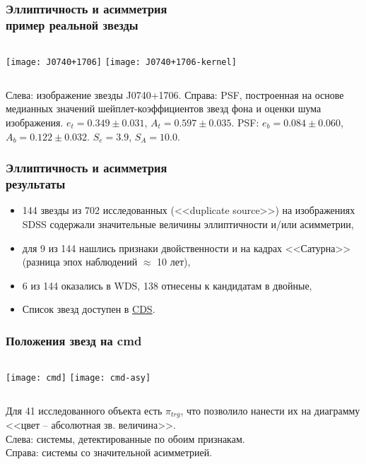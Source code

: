 \begin{frame}
\frametitle{Эллиптичность и асимметрия\\{\small пример реальной звезды}}
\begin{center}
\begin{columns}
	\texttt{[image: J0740+1706]}
	\texttt{[image: J0740+1706-kernel]}
\end{columns}
\end{center}
{\scriptsize
	Слева: изображение звезды J0740+1706. Справа: PSF, построенная на основе медианных значений шейплет-коэффициентов звезд фона и оценки шума изображения. $e_{t} =0.349\pm0.031$,  $A_{t} = 0.597\pm0.035$. PSF: $e_{b} =0.084\pm0.060$,   $A_{b} =0.122\pm0.032$. $S_e=3.9$, $S_A=10.0$.
}
\end{frame}

\begin{frame}
\frametitle{Эллиптичность и асимметрия\\{\small результаты}}
\begin{itemize}
\item 144 звезды из 702 исследованных (<<duplicate source>>) на изображениях SDSS содержали значительные величины эллиптичности и/или асимметрии,
\item для 9 из 144 нашлись признаки двойственности и на кадрах <<Сатурна>> (разница эпох наблюдений $\approx$ 10 лет),
\item 6 из 144 оказались в WDS, 138 отнесены к кандидатам в двойные,
\item Список звезд доступен в \href{http://vizier.u-strasbg.fr/viz-bin/VizieR?-source=J/PAZh/44/124}{CDS}.
\end{itemize}
\end{frame}

\begin{frame}
\frametitle{Положения звезд на cmd}%
\begin{center}
\begin{columns}
	\texttt{[image: cmd]}
	\texttt{[image: cmd-asy]}
\end{columns}
\end{center}
{\footnotesize
	Для 41 исследованного объекта есть $\pi_{trg}$, что позволило нанести их на диаграмму <<цвет -- абсолютная зв. величина>>.\\ Слева: системы, детектированные по обоим признакам.\\ Справа: системы со значительной асимметрией.
}
\end{frame}


